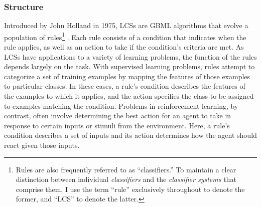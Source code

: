 \documentclass[11pt]{article}
\begin{document}
\subsubsection{Structure}
Introduced by John Holland in 1975, LCSs are GBML algorithms that evolve a population of rules\footnote{Rules are also frequently referred to as ``classifiers.'' To maintain a clear distinction between individual \emph{classifiers} and the \emph{classifier systems} that comprise them, I use the term ``rule'' exclusively throughout to denote the former, and ``LCS'' to denote the latter.} \cite{holland_adaptation_1975}. Each rule consists of a condition that indicates when the rule applies, as well as an action to take if the condition's criteria are met. As LCSs have applications to a variety of learning problems, the function of the rules depends largely on the task. With supervised learning problems, rules attempt to categorize a set of training examples by mapping the features of those examples to particular classes. In these cases, a rule's condition describes the features of the examples to which it applies, and the action specifies the class to be assigned to examples matching the condition. Problems in reinforcement learning, by contrast, often involve determining the best action for an agent to take in response to certain inputs or stimuli from the environment. Here, a rule's condition describes a set of inputs and its action determines how the agent should react given those inputs.
\end{document}
